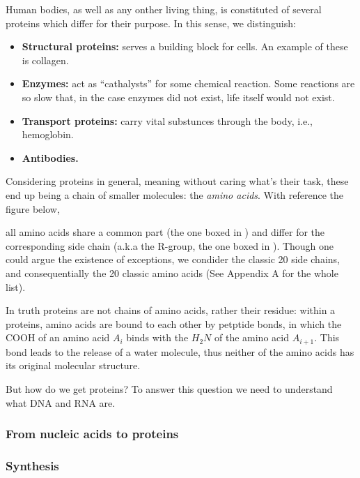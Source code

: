 \documentclass{subfiles}
\begin{document}
    Human bodies, as well as any onther living thing, is constituted of several proteins
        which differ for their purpose. In this sense, we distinguish:
        \begin{itemize}
            \item \textbf{Structural proteins:} serves a building block for cells. 
                An example of these is collagen.

            \item \textbf{Enzymes:} act as ``cathalysts'' for some chemical reaction.
                Some reactions are so slow that, in the case enzymes did not exist, 
                life itself would not exist.

            \item \textbf{Transport proteins:} carry vital substunces through the body,
                i.e., hemoglobin.

            \item \textbf{Antibodies.}
        \end{itemize}

    Considering proteins in general, meaning without caring what's their task, 
        these end up being a chain of smaller molecules: the \emph{amino acids}.
        With reference the figure below,
        
        all amino acids share a common part 
        (the one boxed in ) and differ for the corresponding side chain
        (a.k.a the R-group, the one boxed in ).
        Though one could argue the existence of exceptions, we condider the classic 20 side chains,
        and consequentially the 20 classic amino acids (See Appendix A for the whole list).

    In truth proteins are not chains of amino acids, rather their residue: 
        within a proteins, amino acids are bound to each other by petptide bonds, 
        in which the COOH of an amino acid \(A_{i}\) binds with the \(H_{2}N\) of the amino acid \(A_{i + 1}\).
        This bond leads to the release of a water molecule, thus neither of the amino acids has its original 
        molecular structure.

    But how do we get proteins? To answer this question we need to understand what DNA and RNA are.
    
    \subsubsection{From nucleic acids to proteins}
    

    \subsubsection{Synthesis}
    
\end{document}
